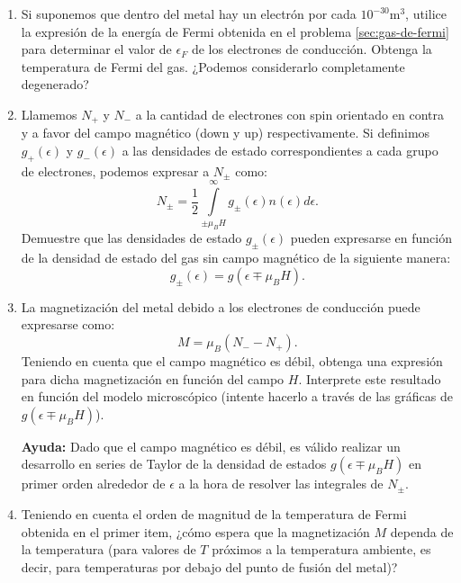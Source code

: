 \documentclass[a4paper,11pt]{article}
\begin{document}
\begin{enumerate}[label=(\alph*),
                  leftmargin=2\parindent,
                  rightmargin=2\parindent]

     \item{Si suponemos que dentro del metal hay un electrón por cada
           $10^{-30}$m$^3$, utilice la expresión de la energía de Fermi 
           obtenida en el problema \ref{sec:gas-de-fermi} para determinar el 
           valor de $\epsilon_F$ de los electrones de conducción.
           Obtenga la temperatura de Fermi del gas.
           ¿Podemos considerarlo completamente degenerado?
           }

     \item{Llamemos $N_+$ y $N_-$ a la cantidad de electrones con spin 
           orientado en contra y a favor del campo magnético (down y up) 
           respectivamente.
           Si definimos $g_+(\epsilon)$ y $g_-(\epsilon)$ a las densidades de 
           estado correspondientes a cada grupo de electrones, podemos 
           expresar a $N_\pm$ como:
           $$
           N_\pm =
           \frac{1}{2} \int\limits_{\pm \mu_B H}^{\infty}
           g_\pm(\epsilon) n(\epsilon) d\epsilon.
           $$
           Demuestre que las densidades de estado $g_\pm(\epsilon)$ pueden 
           expresarse en función de la densidad de estado del gas sin campo 
           magnético de la siguiente manera:
           $$ g_\pm(\epsilon) = g(\epsilon \mp \mu_B H). $$
           }

     \item{La magnetización del metal debido a los electrones de conducción 
           puede expresarse como:
           $$ M = \mu_B (N_- - N_+). $$
           Teniendo en cuenta que el campo magnético es débil, obtenga una 
           expresión para dicha magnetización en función del campo $H$.
           Interprete este resultado en función del modelo microscópico 
           (intente hacerlo a través de las gráficas de
           $g(\epsilon \mp \mu_B H)$).
           }

     {\small \textbf{Ayuda:} Dado que el campo magnético es débil, es válido 
     realizar un desarrollo en series de Taylor de la densidad de estados 
     $g(\epsilon \mp \mu_B H)$ en primer orden alrededor de $\epsilon$ a la 
     hora de resolver las integrales de $N_\pm$.
     }

     \item{Teniendo en cuenta el orden de magnitud de la temperatura de Fermi 
           obtenida en el primer item, ¿cómo espera que la magnetización $M$ 
           dependa de la temperatura (para valores de $T$ próximos a la 
           temperatura ambiente, es decir, para temperaturas por debajo del 
           punto de fusión del metal)?
           }

\end{enumerate}
\end{document}
